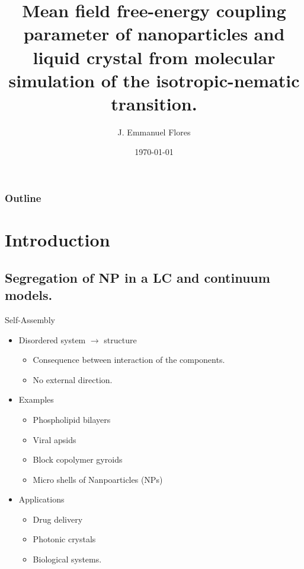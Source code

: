 \documentclass{beamer}
\title[Coupling constant between NP and LC]{Mean field free-energy coupling parameter of nanoparticles and liquid crystal from molecular simulation of the isotropic-nematic transition.}
\author[]{J. Emmanuel Flores \inst{1}}
\institute[Journal Club, Spring 2024]{\inst{1} Tufts University, Medford, MA}
\date{\today}
\begin{document}
\maketitle

\begin{frame}
    \frametitle{Outline}
      \tableofcontents
\end{frame}

\section{Introduction}
\subsection{Segregation of NP in a LC and continuum models.}

\begin{frame}{Self-Assembly}
    \begin{itemize}
        \item Disordered system $\rightarrow$ structure
        \begin{itemize}
            \item Consequence between interaction of the components.
            \item No external direction.
        \end{itemize}
        \item Examples
        \begin{itemize}
            \item Phospholipid bilayers
            \item Viral apsids
            \item Block copolymer gyroids
            \item Micro shells of Nanpoarticles (NPs)
        \end{itemize}
        \item Applications
        \begin{itemize}
            \item Drug delivery
            \item Photonic crystals 
            \item Biological systems.
        \end{itemize}
    \end{itemize}
\end{frame}
\end{document}
